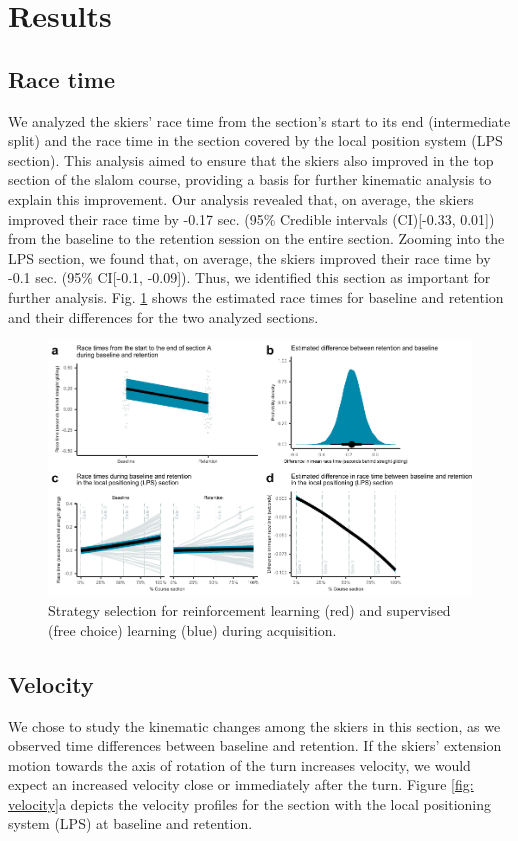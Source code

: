 \documentclass{article}
\begin{document}
\section{Results}



\subsection{Race time}
We analyzed the skiers' race time from the section's start to its end (intermediate split) and the race time in the section covered by the local position system (LPS section). This analysis aimed to ensure that the skiers also improved in the top section of the slalom course, providing a basis for further kinematic analysis to explain this improvement. Our analysis revealed that, on average, the skiers improved their race time by -0.17 sec. (95\% Credible intervals (CI)[-0.33, 0.01]) from the baseline to the retention session on the entire section. Zooming into the LPS section, we found that, on average, the skiers improved their race time by -0.1 sec. (95\% CI[-0.1, -0.09]). Thus, we identified this section as important for further analysis. Fig. \ref{fig: choice_estimated} shows the estimated race times for baseline and retention and their differences for the two analyzed sections. 

\begin{figure}[H]
\centering
\includegraphics{figurer/figure_racetime_2.pdf}
\caption{Strategy selection for reinforcement learning (red) and supervised (free choice) learning (blue) during acquisition.}\label{fig: choice_estimated}
\end{figure}

\subsection{Velocity}
We chose to study the kinematic changes among the skiers in this section, as we observed time differences between baseline and retention. If the skiers' extension motion towards the axis of rotation of the turn increases velocity, we would expect an increased velocity close or immediately after the turn. Figure \ref{fig: velocity}a depicts the velocity profiles for the section with the local positioning system (LPS) at baseline and retention.  
\end{document}

